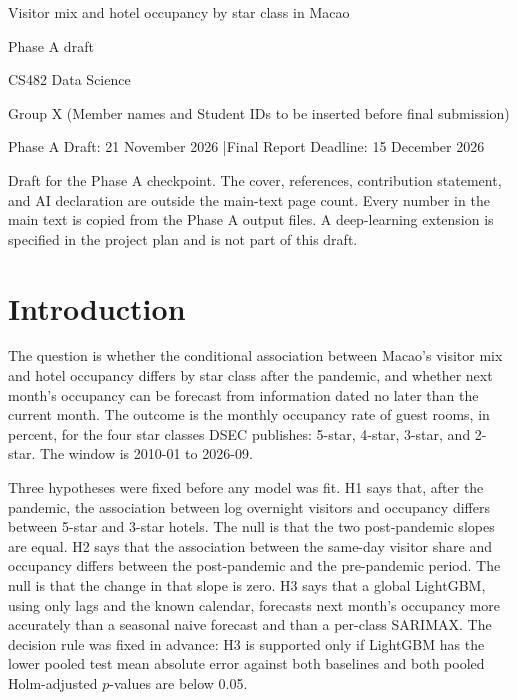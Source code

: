 \documentclass[11pt,a4paper]{article}
\begin{document}
\begin{titlepage}
\centering
\vspace*{22mm}
{\Large Visitor mix and hotel occupancy by star class in Macao\par}
\vspace{0.8em}
{\large Phase A draft\par}
\vspace{0.8em}
CS482 Data Science\par
Group X (Member names and Student IDs to be inserted before final submission)\par
\vspace{0.6em}
Phase A Draft: 21 November 2026 \quad|\quad Final Report Deadline: 15 December 2026\par
\vspace{1.6em}
\begin{minipage}{\textwidth}
\raggedright
Draft for the Phase A checkpoint. The cover, references, contribution statement, and AI declaration are outside the main-text page count. Every number in the main text is copied from the Phase A output files. A deep-learning extension is specified in the project plan and is not part of this draft.
\end{minipage}
\end{titlepage}

\section{Introduction}
The question is whether the conditional association between Macao's visitor mix and hotel occupancy differs by star class after the pandemic, and whether next month's occupancy can be forecast from information dated no later than the current month. The outcome is the monthly occupancy rate of guest rooms, in percent, for the four star classes DSEC publishes: 5-star, 4-star, 3-star, and 2-star. The window is 2010-01 to 2026-09.

Three hypotheses were fixed before any model was fit. H1 says that, after the pandemic, the association between log overnight visitors and occupancy differs between 5-star and 3-star hotels. The null is that the two post-pandemic slopes are equal. H2 says that the association between the same-day visitor share and occupancy differs between the post-pandemic and the pre-pandemic period. The null is that the change in that slope is zero. H3 says that a global LightGBM, using only lags and the known calendar, forecasts next month's occupancy more accurately than a seasonal naive forecast and than a per-class SARIMAX. The decision rule was fixed in advance: H3 is supported only if LightGBM has the lower pooled test mean absolute error against both baselines and both pooled Holm-adjusted \(p\)-values are below 0.05.
\end{document}
